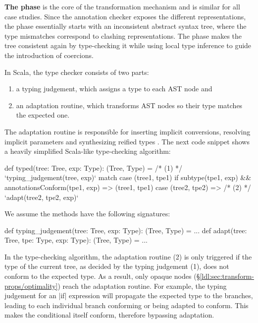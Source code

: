 \textbf{The \coerce{} phase} is the core of the transformation mechanism and is similar for all case studies. Since the annotation checker exposes the different representations, the \coerce{} phase essentially starts with an inconsistent abstract syntax tree, where the type mismatches correspond to clashing representations. The \coerce{} phase makes the tree consistent again by type-checking it while using local type inference to guide the introduction of coercions.

In Scala, the type checker consists of two parts:
\begin{enumerate}
\item a typing judgement, which assigns a type to each AST node and
\item an adaptation routine, which transforms AST nodes so their type matches the expected one.
\end{enumerate}

The adaptation routine is responsible for inserting implicit conversions, resolving implicit parameters and synthesizing reified types \cite{michel-thesis}. The next code snippet shows a heavily simplified Scala-like type-checking algorithm:

\begin{lstlisting-nobreak}
 def typed(tree: Tree, exp: Type): (Tree, Type) =
   /* (1) */ `typing_judgement(tree, exp)` match {
     case (tree1, tpe1) if
           subtype(tpe1, exp) &&
           annotationsConform(tpe1, exp) =>
       (tree1, tpe1)
     case (tree2, tpe2) =>
       /* (2) */ `adapt(tree2, tpe2, exp)`
   }
\end{lstlisting-nobreak}

We assume the methods have the following signatures:

\begin{lstlisting-nobreak}
 def typing_judgement(tree: Tree, exp: Type):
                                         (Tree, Type) = ...
 def adapt(tree: Tree, tpe: Type, exp: Type):
                                         (Tree, Type) = ...
\end{lstlisting-nobreak}

In the type-checking algorithm, the adaptation routine (2) is only triggered if the type of the current tree, as decided by the typing judgement (1), does not conform to the expected type. As a result, only opaque nodes (\S\ref{ldl:sec:transform-props/optimality}) reach the adaptation routine. For example, the typing judgement for an |if| expression will propagate the expected type to the branches, leading to each individual branch conforming or being adapted to conform. This makes the conditional itself conform, therefore bypassing adaptation.

